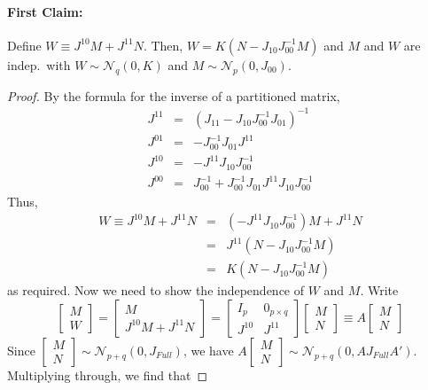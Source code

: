 \documentclass[12pt]{article}
\theoremstyle{definition}
\begin{document}
\paragraph{First Claim:} Define $W\equiv J^{10}M+J^{11}N$. Then, $W= K(N - J_{10}J_{00}^{-1}M)$ and $M$ and $W$ are indep.\ with $W\sim \mathcal{N}_q(0,K)$ and $M\sim\mathcal{N}_p(0,J_{00})$.
\begin{proof}
By the formula for the inverse of a partitioned matrix,
	\begin{eqnarray*}
		J^{11} &=&\left(J_{11} - J_{10}J_{00}^{-1}J_{01}\right)^{-1}\\
		J^{01} &=&-J_{00}^{-1}J_{01}J^{11}\\
		J^{10} &=&-J^{11}J_{10}J_{00}^{-1}\\
		J^{00} &=& J_{00}^{-1} + J_{00}^{-1}J_{01}J^{11}J_{10}J_{00}^{-1}
	\end{eqnarray*}
Thus,
	\begin{eqnarray*}
		W \equiv J^{10}M + J^{11}N &=& \left(-J^{11}J_{10}J_{00}^{-1}\right)M + J^{11}N\\
			&=&J^{11}\left( N - J_{10}J_{00}^{-1}M \right)\\
			&=&K\left( N - J_{10}J_{00}^{-1}M \right)
	\end{eqnarray*}
as required. Now we need to show the independence of $W$ and $M$. Write
	$$
	\left[\begin{array}{c}
		M\\
		W
	\end{array}\right] = \left[\begin{array}{c}
		M\\
		J^{10}M + J^{11}N
	\end{array}\right] = \left[\begin{array}{cc}
		I_p&0_{p\times q}\\
		J^{10}&J^{11}
	\end{array}\right]\left[\begin{array}{c}
		M\\
		N
	\end{array}\right]\equiv A \left[\begin{array}{c}
		M\\
		N
	\end{array}\right]
$$
Since $\left[\begin{array}{c} M\\ N \end{array}\right]\sim \mathcal{N}_{p+q}(0, J_{Full})$, we have $A\left[\begin{array}{c} M\\ N \end{array}\right]\sim \mathcal{N}_{p+q}(0, A J_{Full}A')$. Multiplying through, we find that

\end{proof}
\end{document}
